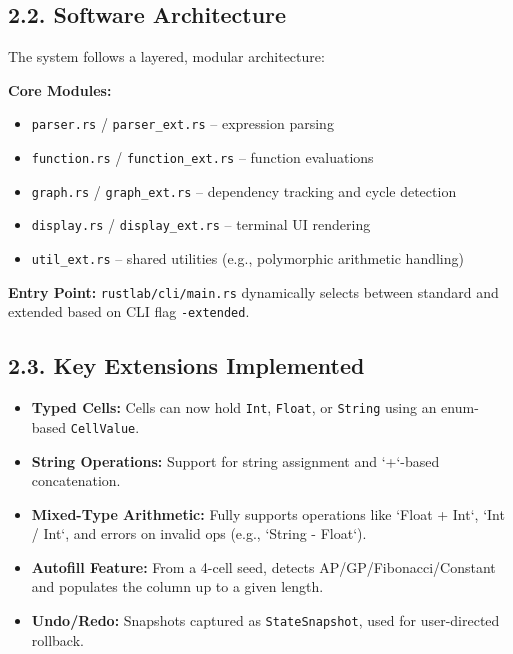 \subsection*{2.2. Software Architecture}
The system follows a layered, modular architecture:

\textbf{Core Modules:}
\begin{itemize}
    \item \texttt{parser.rs} / \texttt{parser\_ext.rs} – expression parsing
    \item \texttt{function.rs} / \texttt{function\_ext.rs} – function evaluations
    \item \texttt{graph.rs} / \texttt{graph\_ext.rs} – dependency tracking and cycle detection
    \item \texttt{display.rs} / \texttt{display\_ext.rs} – terminal UI rendering
    \item \texttt{util\_ext.rs} – shared utilities (e.g., polymorphic arithmetic handling)
\end{itemize}

\textbf{Entry Point:} \texttt{rustlab/cli/main.rs} dynamically selects between standard and extended based on CLI flag \texttt{-extended}.

\subsection*{2.3. Key Extensions Implemented}
\begin{itemize}
    \item \textbf{Typed Cells:} Cells can now hold \texttt{Int}, \texttt{Float}, or \texttt{String} using an enum-based \texttt{CellValue}.
    \item \textbf{String Operations:} Support for string assignment and `+`-based concatenation.
    \item \textbf{Mixed-Type Arithmetic:} Fully supports operations like `Float + Int`, `Int / Int`, and errors on invalid ops (e.g., `String - Float`).
    \item \textbf{Autofill Feature:} From a 4-cell seed, detects AP/GP/Fibonacci/Constant and populates the column up to a given length.
    \item \textbf{Undo/Redo:} Snapshots captured as \texttt{StateSnapshot}, used for user-directed rollback.
\end{itemize}

